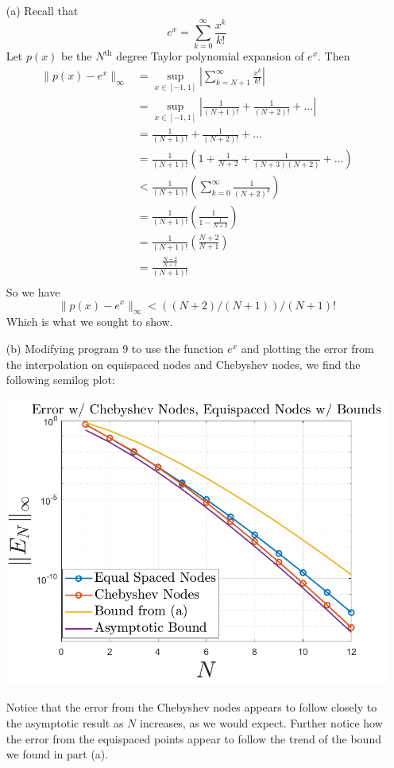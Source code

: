 \documentclass{article}
\begin{document}
\begin{itemize}
    \item[(a)] Recall that 
    \[e^x = \sum_{k=0}^{\infty} \frac{x^k}{k!}\]
    Let $p(x)$ be the $N^{\text{th}}$ degree Taylor polynomial expansion of $e^x$. Then 
    \begin{align*}
        \|p(x) - e^x \|_{\infty} &= \sup_{x\in [-1,1]} \left| \sum_{k=N+1}^{\infty} \frac{x^k}{k!}\right| \\
        &= \sup_{x \in [-1,1]} \left| \frac{1}{(N+1)!} + \frac{1}{(N+2)!} + \hdots \right| \\
        &= \frac{1}{(N+1)!} + \frac{1}{(N+2)!} + \hdots \\
        &= \frac{1}{(N+1)!}\left( 1 + \frac{1}{N+2} + \frac{1}{(N+3)(N+2)} + \hdots \right) \\
        &<\frac{1}{(N+1)!}\left( \sum_{k=0}^{\infty} \frac{1}{(N+2)^k} \right) \\
        &= \frac{1}{(N+1)!}\left( \frac{1}{1 - \frac{1}{N+2}} \right) \\
        &= \frac{1}{(N+1)!}\left( \frac{N+2}{N+1} \right) \\
        &= \frac{\frac{N+2}{N+1}}{(N+1)!} \\
    \end{align*}
    So we have
    \[\|p(x) - e^x\|_{\infty} < ((N+2)/(N+1))/(N+1)!\]
    Which is what we sought to show.

    \item[(b)] Modifying program 9 to use the function $e^x$ and plotting the error from the interpolation on equispaced nodes and Chebyshev nodes, we find the following semilog plot:
    \begin{center}
        \includegraphics[scale = 0.6]{errorBounds}
    \end{center}
    Notice that the error from the Chebyshev nodes appears to follow closely to the asymptotic result as $N$ increases, as we would expect. Further notice how the error from the equispaced points appear to follow the trend of the bound we found in part (a).
\end{itemize}
\end{document}
